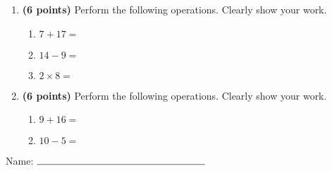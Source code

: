 \documentclass[12pt]{amsart}
\begin{document}
\newpage
\begin{enumerate}
\item {\bf (6 points)} 
 Perform the following operations. Clearly show your work. \begin{enumerate}


\def \a{7}\def \b{17}\def \apb{24}

 
\item $\a + \b = $

\vspace{2cm}
\def \a{14}\def \dif{5}\def \b{9}

 
\item $\a - \b = $

\vspace{2cm}
\def \a{2}\def \b{8}\def \ab{10}

 
\item $\a \times \b = $ 

\vspace{2cm}
\def \vshift{1}\def \hshift{-2}\def \chang{-1}\def \findval{-3}\def \yval{3}

 
\end{enumerate}


\newpage
\item {\bf (6 points)} 
 Perform the following operations. Clearly show your work. \begin{enumerate}


\def \a{9}\def \b{16}\def \apb{25}

 
\item $\a + \b = $

\vspace{2cm}
\def \a{10}\def \dif{5}\def \b{5}

 
\item $\a - \b = $

\vspace{2cm}
\def \vshift{5}\def \hshift{-2}\def \chang{1}\def \findval{-1}\def \yval{3}

 
\end{enumerate}


\newpage\end{enumerate}\graphicspath{{C:/Users/iainc/anaconda3/Randomizer/Sample Course/Sample Assessment 2/}}\setcounter{page}{1}


\thispagestyle{fancy}

 
\noindent Name: $\rule{6cm}{0.15mm}$

\vspace{.2cm}
\end{document}
